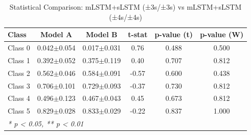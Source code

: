 \begin{table}[htbp]
\centering
\caption{Statistical Comparison: mLSTM+sLSTM (±3s/±3s) vs mLSTM+sLSTM (±4s/±4s)}
\label{tab:comparison_class_mlstmslstm_±3s_±3s_vs_mlstmslstm_±4s_±4s}
\begin{tabular}{lccccc}
\toprule
\textbf{Class} & \textbf{Model A} & \textbf{Model B} & \textbf{t-stat} & \textbf{p-value (t)} & \textbf{p-value (W)} \\
\midrule
Class 0 & 0.042$\pm$0.054 & 0.017$\pm$0.031 & 0.76 & 0.488 & 0.500 \\
Class 1 & 0.392$\pm$0.052 & 0.375$\pm$0.119 & 0.40 & 0.707 & 0.812 \\
Class 2 & 0.562$\pm$0.046 & 0.584$\pm$0.091 & -0.57 & 0.600 & 0.438 \\
Class 3 & 0.706$\pm$0.101 & 0.729$\pm$0.093 & -0.37 & 0.730 & 0.812 \\
Class 4 & 0.496$\pm$0.123 & 0.467$\pm$0.043 & 0.45 & 0.673 & 0.812 \\
Class 5 & 0.829$\pm$0.028 & 0.833$\pm$0.029 & -0.22 & 0.837 & 1.000 \\
\bottomrule
\multicolumn{6}{l}{\textit{* p < 0.05, ** p < 0.01}} \\
\end{tabular}
\end{table}